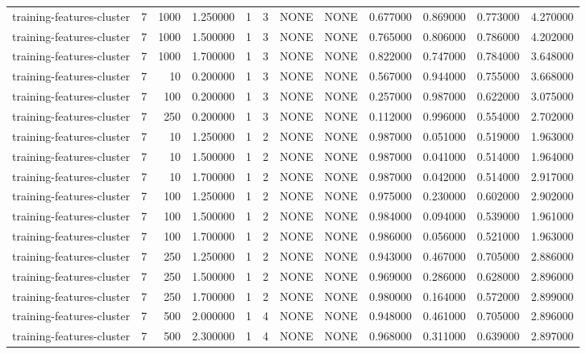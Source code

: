 \begin{tabular}{lrrrllllrrrr}
training-features-cluster & 7 & 1000 & 1.250000 & 1 & 3 & NONE & NONE & 0.677000 & 0.869000 & 0.773000 & 4.270000 \\
training-features-cluster & 7 & 1000 & 1.500000 & 1 & 3 & NONE & NONE & 0.765000 & 0.806000 & 0.786000 & 4.202000 \\
training-features-cluster & 7 & 1000 & 1.700000 & 1 & 3 & NONE & NONE & 0.822000 & 0.747000 & 0.784000 & 3.648000 \\
training-features-cluster & 7 & 10 & 0.200000 & 1 & 3 & NONE & NONE & 0.567000 & 0.944000 & 0.755000 & 3.668000 \\
training-features-cluster & 7 & 100 & 0.200000 & 1 & 3 & NONE & NONE & 0.257000 & 0.987000 & 0.622000 & 3.075000 \\
training-features-cluster & 7 & 250 & 0.200000 & 1 & 3 & NONE & NONE & 0.112000 & 0.996000 & 0.554000 & 2.702000 \\
training-features-cluster & 7 & 10 & 1.250000 & 1 & 2 & NONE & NONE & 0.987000 & 0.051000 & 0.519000 & 1.963000 \\
training-features-cluster & 7 & 10 & 1.500000 & 1 & 2 & NONE & NONE & 0.987000 & 0.041000 & 0.514000 & 1.964000 \\
training-features-cluster & 7 & 10 & 1.700000 & 1 & 2 & NONE & NONE & 0.987000 & 0.042000 & 0.514000 & 2.917000 \\
training-features-cluster & 7 & 100 & 1.250000 & 1 & 2 & NONE & NONE & 0.975000 & 0.230000 & 0.602000 & 2.902000 \\
training-features-cluster & 7 & 100 & 1.500000 & 1 & 2 & NONE & NONE & 0.984000 & 0.094000 & 0.539000 & 1.961000 \\
training-features-cluster & 7 & 100 & 1.700000 & 1 & 2 & NONE & NONE & 0.986000 & 0.056000 & 0.521000 & 1.963000 \\
training-features-cluster & 7 & 250 & 1.250000 & 1 & 2 & NONE & NONE & 0.943000 & 0.467000 & 0.705000 & 2.886000 \\
training-features-cluster & 7 & 250 & 1.500000 & 1 & 2 & NONE & NONE & 0.969000 & 0.286000 & 0.628000 & 2.896000 \\
training-features-cluster & 7 & 250 & 1.700000 & 1 & 2 & NONE & NONE & 0.980000 & 0.164000 & 0.572000 & 2.899000 \\
training-features-cluster & 7 & 500 & 2.000000 & 1 & 4 & NONE & NONE & 0.948000 & 0.461000 & 0.705000 & 2.896000 \\
training-features-cluster & 7 & 500 & 2.300000 & 1 & 4 & NONE & NONE & 0.968000 & 0.311000 & 0.639000 & 2.897000 \\

\end{tabular}
